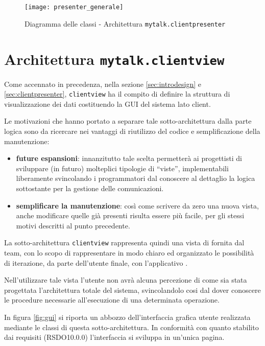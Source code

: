 \begin{figure}[H]
  \centering
  \texttt{[image: presenter\_generale]}
  \caption{Diagramma delle classi - Architettura \texttt{mytalk.clientpresenter}}\label{fig:sottoarchpresenter}
  \end{figure}
\clearpage

\section{Architettura \texttt{mytalk.clientview}}\label{sec:clientview}
Come accennato in precedenza, nella sezione \ref{sec:introdesign} e \ref{sec:clientpresenter}, \texttt{clientview} ha il compito di definire la struttura di visualizzazione dei dati costituendo la GUI del sistema lato client.

Le motivazioni che hanno portato a separare tale sotto-architettura dalla parte logica sono da ricercare nei vantaggi di riutilizzo del codice e semplificazione della manutenzione:
\begin{itemize}
 	\item \textbf{future espansioni}: innanzitutto tale scelta permetterà ai progettisti di sviluppare (in futuro) molteplici tipologie di ``viste'', implementabili liberamente svincolando i programmatori dal conoscere al dettaglio la logica sottostante per la gestione delle comunicazioni.
 	\item \textbf{semplificare la manutenzione}: così come scrivere da zero una nuova vista, anche modificare quelle già presenti risulta essere più facile, per gli stessi motivi descritti al punto precedente.
\end{itemize}

La sotto-architettura \texttt{clientview} rappresenta quindi una vista di  fornita dal team, con lo scopo di rappresentare in modo chiaro ed organizzato le possibilità di iterazione, da parte dell'utente finale, con l'applicativo \caName.

Nell'utilizzare tale vista l'utente non avrà alcuna percezione di come sia stata progettata l'architettura totale del sistema, svincolandolo cosi dal dover conoscere le procedure necessarie all'esecuzione di una determinata operazione.

In figura \ref{fig:gui} si riporta un abbozzo dell'interfaccia grafica utente realizzata mediante le classi di questa sotto-architettura. In conformità con quanto stabilito dai requisiti (RSDO10.0.0) l'interfaccia si sviluppa in un'unica pagina.

